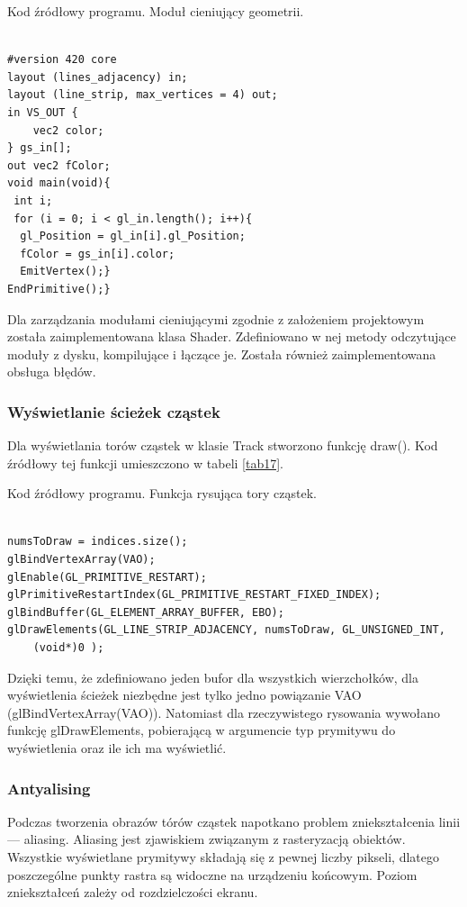 \begin{table}[H]
\caption{Kod źródłowy programu. Moduł cieniujący geometrii.}
\label{tab9}
\begin{lstlisting}[frame=single]  % Start your code-block

#version 420 core
layout (lines_adjacency) in;
layout (line_strip, max_vertices = 4) out;
in VS_OUT {
    vec2 color;
} gs_in[];
out vec2 fColor;
void main(void){
 int i;
 for (i = 0; i < gl_in.length(); i++){
  gl_Position = gl_in[i].gl_Position;
  fColor = gs_in[i].color;
  EmitVertex();}
EndPrimitive();}
\end{lstlisting}
\end{table}

Dla zarządzania modułami cieniującymi zgodnie z założeniem projektowym została zaimplementowana klasa Shader. Zdefiniowano w nej metody odczytujące moduły z dysku, kompilujące i łączące je. Została również zaimplementowana obsługa błędów. 

\subsubsection{Wyświetlanie ścieżek cząstek}

Dla wyświetlania torów cząstek w klasie Track stworzono funkcję draw(). Kod źródłowy tej funkcji umieszczono w tabeli \ref{tab17}.

\begin{table}[H]
\caption{Kod źródłowy programu. Funkcja rysująca tory cząstek.}
\label{tab17}
\begin{lstlisting}[frame=single]  % Start your code-block

numsToDraw = indices.size();
glBindVertexArray(VAO);
glEnable(GL_PRIMITIVE_RESTART);
glPrimitiveRestartIndex(GL_PRIMITIVE_RESTART_FIXED_INDEX);
glBindBuffer(GL_ELEMENT_ARRAY_BUFFER, EBO);
glDrawElements(GL_LINE_STRIP_ADJACENCY, numsToDraw, GL_UNSIGNED_INT, 
	(void*)0 );
\end{lstlisting}
\end{table}
Dzięki temu, że zdefiniowano jeden bufor dla wszystkich wierzchołków, dla wyświetlenia ścieżek niezbędne jest tylko jedno powiązanie VAO (glBindVertexArray(VAO)). Natomiast dla rzeczywistego rysowania wywołano funkcję glDrawElements, pobierającą w argumencie typ prymitywu do wyświetlenia oraz ile ich ma wyświetlić.

\subsubsection{Antyalising}
Podczas tworzenia obrazów tórów cząstek napotkano problem zniekształcenia linii --- aliasing. Aliasing jest zjawiskiem związanym z rasteryzacją obiektów. Wszystkie wyświetlane prymitywy składają się z pewnej liczby pikseli, dlatego poszczególne punkty rastra są widoczne na urządzeniu końcowym. Poziom zniekształceń zależy od rozdzielczości ekranu. 

